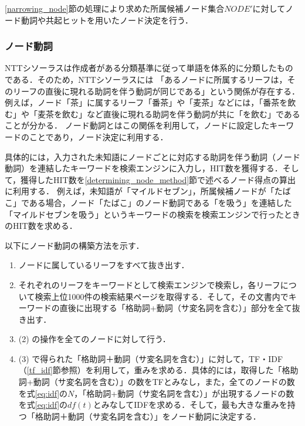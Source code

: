 \documentclass[japanese]{jnlp_1.4}
\begin{document}
\ref{narrowing_node}節の処理により求めた所属候補ノード集合$\mathit{NODE}'$に対してノード動詞や共起ヒットを用いたノード決定を行う．

\subsubsection{ノード動詞}\label{node_verb}

NTTシソーラスは作成者がある分類基準に従って単語を体系的に分類したものである．そのため，NTTシソーラスには
「あるノードに所属するリーフは，そのリーフの直後に現れる助詞を伴う動詞が同じである」という関係が存在する．例えば，ノード「茶」に属するリーフ「番茶」や「麦茶」などには，「番茶を飲む」や「麦茶を飲む」など直後に現れる助詞を伴う動詞が共に「を飲む」であることが分かる．
ノード動詞とはこの関係を利用して，ノードに設定したキーワードのことであり，ノード決定に利用する．

具体的には，入力された未知語にノードごとに対応する助詞を伴う動詞（ノード動詞）を連結したキーワードを検索エンジンに入力し，HIT数を獲得する．そして，獲得したHIT数を\ref{determining_node_method}節で述べるノード得点の算出に利用する．
例えば，未知語が「マイルドセブン」，所属候補ノードが「たばこ」である場合，ノード「たばこ」のノード動詞である「を吸う」を連結した「マイルドセブンを吸う」というキーワードの検索を検索エンジンで行ったときのHIT数を求める．

以下にノード動詞の構築方法を示す．
\begin{enumerate}

\item ノードに属しているリーフをすべて抜き出す．

\item それぞれのリーフをキーワードとして検索エンジンで検索し，各リーフについて検索上位1000件の検索結果ページを取得する．そして，その文書内でキーワードの直後に出現する「格助詞+動詞（サ変名詞を含む）」部分を全て抜き出す．

\item (2) の操作を全てのノードに対して行う．

\item (3) で得られた「格助詞＋動詞（サ変名詞を含む）」に対して，TF・IDF（\ref{tf_idf}節参照）を利用して，重みを求める．具体的には，取得した「格助詞+動詞（サ変名詞を含む）」の数をTFとみなし，また，全てのノードの数を式\ref{eq:idf}の$N$，「格助詞+動詞（サ変名詞を含む）」が出現するノードの数を式\ref{eq:idf}の$\mathit{df}(t)$とみなしてIDFを求める．そして，最も大きな重みを持つ「格助詞＋動詞（サ変名詞を含む）」をノード動詞に決定する．

\end{enumerate}
\end{document}
